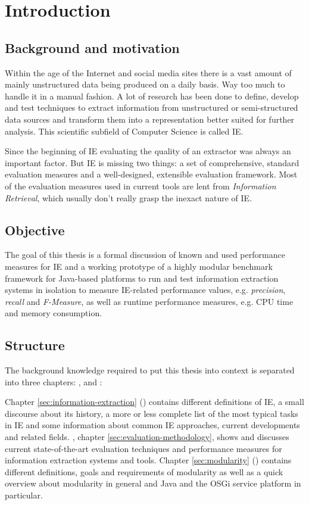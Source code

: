 \section{Introduction}

\subsection{Background and motivation}
Within the age of the Internet and social media sites there is a vast amount of mainly unstructured data being produced on a daily basis. Way too much to handle it in a manual fashion. A lot of research has been done to define, develop and test techniques to extract information from unstructured or semi-structured data sources and transform them into a representation better suited for further analysis. This scientific subfield of Computer Science is called \gls{IE}.

Since the beginning of \gls{IE} evaluating the quality of an extractor was always an important factor. But \gls{IE} is missing two things: a set of comprehensive, standard evaluation measures and a well-designed, extensible evaluation framework. Most of the evaluation measures used in current tools are lent from \textit{Information Retrieval}, which usually don't really grasp the inexact nature of \gls{IE}.

\subsection{Objective}
The goal of this thesis is a formal discussion of known and used performance measures for IE and a working prototype of a highly modular benchmark framework for Java-based platforms to run and test information extraction systems in isolation to measure IE-related performance values, e.g. \textit{precision}, \textit{recall} and \textit{F-Measure}, as well as runtime performance measures, e.g. CPU time and memory consumption.

\subsection{Structure}
The background knowledge required to put this thesis into context is separated into three chapters: ,  and :

Chapter \ref{sec:information-extraction} () contains different definitions of \gls{IE}, a small discourse about its history, a more or less complete list of the most typical tasks in \gls{IE} and some information about common \gls{IE} approaches, current developments and related fields. , chapter \ref{sec:evaluation-methodology}, shows and discusses current state-of-the-art evaluation techniques and performance measures for information extraction systems and tools. Chapter \ref{sec:modularity} () contains different definitions, goals and requirements of modularity as well as a quick overview about modularity in general and Java and the \gls{OSGi} service platform in particular.

